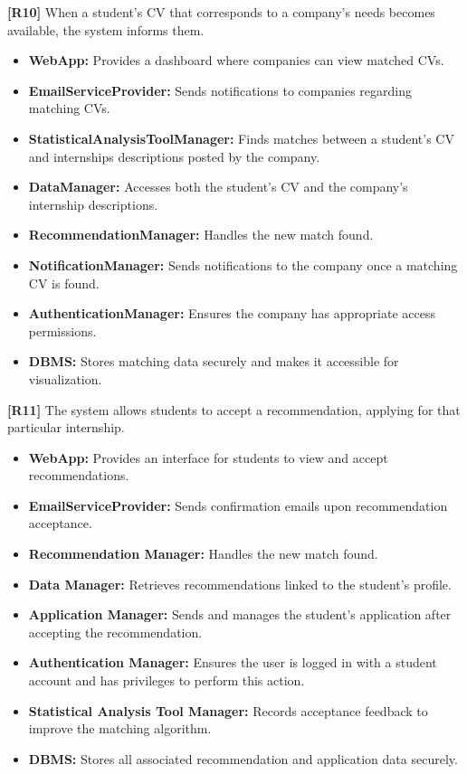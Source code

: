 \textbf{[R10]} When a student's CV that corresponds to a company's needs becomes available, the system informs them.  
\begin{itemize}
    \item \textbf{WebApp:} Provides a dashboard where companies can view matched CVs.
    \item \textbf{EmailServiceProvider:} Sends notifications to companies regarding matching CVs.
    \item \textbf{StatisticalAnalysisToolManager:} Finds matches between a student’s CV and internships descriptions posted by the company.
    \item \textbf{DataManager:} Accesses both the student's CV and the company's internship descriptions.
    \item \textbf{RecommendationManager:} Handles the new match found.
    \item \textbf{NotificationManager:} Sends notifications to the company once a matching CV is found.
    \item \textbf{AuthenticationManager:} Ensures the company has appropriate access permissions.
    \item \textbf{DBMS:} Stores matching data securely and makes it accessible for visualization.
\end{itemize}

\textbf{[R11]} The system allows students to accept a recommendation, applying for that particular internship. 
\begin{itemize}
    \item \textbf{WebApp:} Provides an interface for students to view and accept recommendations.
    \item \textbf{EmailServiceProvider:} Sends confirmation emails upon recommendation acceptance.
    \item \textbf{Recommendation Manager:} Handles the new match found.
    \item \textbf{Data Manager:} Retrieves recommendations linked to the student's profile.
    \item \textbf{Application Manager:} Sends and manages the student's application after accepting the recommendation.
    \item \textbf{Authentication Manager:} Ensures the user is logged in with a student account and has privileges to perform this action.
    \item \textbf{Statistical Analysis Tool Manager:} Records acceptance feedback to improve the matching algorithm.
    \item \textbf{DBMS:} Stores all associated recommendation and application data securely.
\end{itemize}

